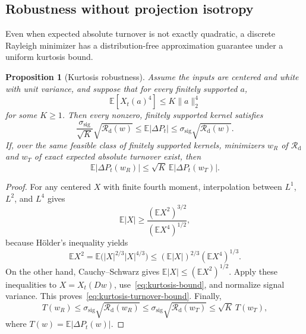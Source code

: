 \documentclass[11pt]{article}
\newtheorem{proposition}[theorem]{Proposition}
\theoremstyle{definition}
\theoremstyle{remark}
\newcommand{\Rcal}{\mathcal R}
\begin{document}
\subsection{Robustness without projection isotropy}
Even when expected absolute turnover is not exactly quadratic, a discrete
Rayleigh minimizer has a distribution-free approximation guarantee under a
uniform kurtosis bound.

\begin{proposition}[Kurtosis robustness]\label{prop:kurtosis}
Assume the inputs are centered and white with unit variance, and suppose that
for every finitely supported $a$,
\begin{equation}\label{eq:kurtosis-bound}
 \mathbb E[X_t(a)^4]\leq K\|a\|_2^4
\end{equation}
for some $K\geq1$. Then every nonzero, finitely supported kernel satisfies
\begin{equation}\label{eq:kurtosis-turnover-bound}
 \frac{\sigma_{\mathrm{sig}}}{\sqrt K}
 \sqrt{\Rcal_{\mathrm d}(w)}
 \leq\mathbb E|\Delta P_t|
 \leq\sigma_{\mathrm{sig}}\sqrt{\Rcal_{\mathrm d}(w)}.
\end{equation}
If, over the same feasible class of finitely supported kernels, minimizers
$w_R$ of $\Rcal_{\mathrm d}$ and $w_T$ of exact expected absolute turnover
exist, then
\begin{equation}\label{eq:kurtosis-approximation}
 \mathbb E|\Delta P_t(w_R)|
 \leq\sqrt K\,\mathbb E|\Delta P_t(w_T)|.
\end{equation}
\end{proposition}
\begin{proof}
For any centered $X$ with finite fourth moment, interpolation between
$L^1$, $L^2$, and $L^4$ gives
\[
 \mathbb E|X|
 \geq\frac{(\mathbb E X^2)^{3/2}}{(\mathbb E X^4)^{1/2}},
\]
because H\"older's inequality yields
\[
 \mathbb E X^2
 =\mathbb E\bigl(|X|^{2/3}|X|^{4/3}\bigr)
 \leq(\mathbb E|X|)^{2/3}(\mathbb E X^4)^{1/3}.
\]
On the other hand, Cauchy--Schwarz gives
$\mathbb E|X|\leq(\mathbb E X^2)^{1/2}$. Apply these inequalities to
$X=X_t(Dw)$, use~\eqref{eq:kurtosis-bound}, and normalize signal variance.
This proves~\eqref{eq:kurtosis-turnover-bound}. Finally,
\[
 T(w_R)\leq\sigma_{\mathrm{sig}}\sqrt{\Rcal_{\mathrm d}(w_R)}
 \leq\sigma_{\mathrm{sig}}\sqrt{\Rcal_{\mathrm d}(w_T)}
 \leq\sqrt K\,T(w_T),
\]
where $T(w)=\mathbb E|\Delta P_t(w)|$.
\end{proof}
\end{document}
